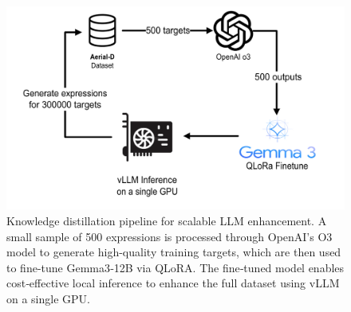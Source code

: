 \begin{figure}[!b]
\centering
\includegraphics[width=\columnwidth]{./images/distillation.png}
\caption{Knowledge distillation pipeline for scalable LLM enhancement. A small sample of 500 expressions is processed through OpenAI's O3 model to generate high-quality training targets, which are then used to fine-tune Gemma3‑12B via QLoRA. The fine‑tuned model enables cost‑effective local inference to enhance the full dataset using vLLM on a single GPU.}
\label{fig:llm_distillation}
\end{figure}
